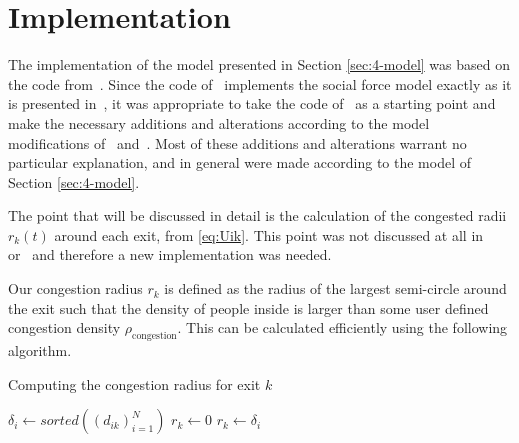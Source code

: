 \section{Implementation}
The implementation of the model presented in Section \ref{sec:4-model} was based on the code from~\citet{Hardmeier2012}. Since the code of~\citet{Hardmeier2012} implements the social force model exactly as it is presented in~\citet{Helbing2000}, it was appropriate to take the code of~\citet{Hardmeier2012} as a starting point and make the necessary additions and alterations according to the model modifications of~\citet{Zainuddin2010} and~\citet{Wang2016}. Most of these additions and alterations warrant no particular explanation, and in general were made according to the model of Section \ref{sec:4-model}.

The point that will be discussed in detail is the calculation of the congested radii $r_k(t)$ around each exit, from \eqref{eq:Uik}. This point was not discussed at all in~\citet{Zainuddin2010} or~\citet{Wang2016} and therefore a new implementation was needed.

Our congestion radius $r_k$ is defined as the radius of the largest semi-circle around the exit such that the density of people inside is larger than some user defined congestion density $\rho_{\textrm{congestion}}$. This can be calculated efficiently using the following algorithm.

\begin{algorithm}
	\caption{Computing the congestion radius for exit $k$}
	\begin{algorithmic}
		\State $\delta_i \gets sorted((d_{ik})_{i=1}^{N})$   
		\State $r_k \gets 0$
				\State $r_k \gets \delta_i$
			\Else
				\State {}
			\EndIf
		\EndFor{}
		\State {}
	\end{algorithmic}
\end{algorithm}

